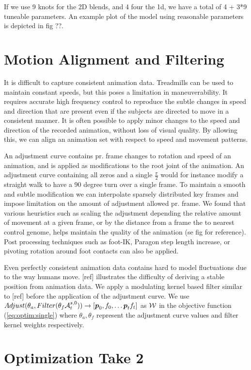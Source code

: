 If we use 9 knots for the 2D blends, and 4 four the 1d, we have a total of 4 + 3*9 tuneable parameters. An example plot of the model using reasonable parameters is depicted in fig ??.

\section{Motion Alignment and Filtering}
It is difficult to capture consistent animation data. Treadmills can be used to maintain constant speeds, but this poses a limitation in maneuverability. It requires accurate high frequency control to reproduce the subtle changes in speed and direction that are present even if the subjects are directed to move in a consistent manner. It is often possible to apply minor changes to the speed and direction of the recorded animation, without loss of visual quality. By allowing this, we can align an animation set with respect to speed and movement patterns. 

An adjustment curve contains pr. frame changes to rotation and speed of an animation, and is applied as modifications to the root joint of the animation. An adjustment curve containing all zeros and a single $\frac{\pi}{2}$ would for instance modify a straight walk to have a 90 degree turn over a single frame. To maintain a smooth and subtle modification we can interpolate sparsely distributed key frames and impose limitation on the amount of adjustment allowed pr. frame. We found that various heuristics such as scaling the adjustment depending the relative amount of movement at a given frame, or by the distance from a frame the to nearest control genome, helps maintain the quality of the animation (se fig for reference). Post processing techniques such as foot-IK, Paragon step length increase, or pivoting rotation around foot contacts can also be applied.

Even perfectly consistent animation data contains hard to model fluctuations due to the way humans move. [ref] illustrates the difficulty of deriving a stable position from animation data. We apply a modulating kernel based filter similar to [ref] before the application of the adjustment curve. We use $Adjust(\theta_a,Filter(\theta_f\mathcal{A}^{s,0}_t))\rightarrow{}[\boldsymbol{p }_0,f_0, \ldots \boldsymbol{p }_tf_t]$ as $\mathcal{W}$ in the objective function (\ref{eq:optim:single}) where $\theta_a, \theta_f$ represent the adjustment curve values and filter kernel weights respectively.

\section{Optimization Take 2}


